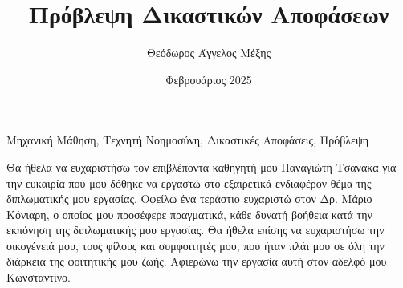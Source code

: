 \documentclass[diploma]{softlab-thesis}
\begin{document}

\frontmatter

\title{Πρόβλεψη Δικαστικών Αποφάσεων}
\author{Θεόδωρος Άγγελος Μέξης}
\date{Φεβρουάριος 2025 }




\maketitle



\begin{abstractgr}%

\begin{keywordsgr}
  Μηχανική Μάθηση,
  Τεχνητή Νοημοσύνη,
  Δικαστικές Αποφάσεις,
  Πρόβλεψη
\end{keywordsgr}
\end{abstractgr}



\begin{abstracten}%

\begin{keywordsen}

\end{keywordsen}
\end{abstracten}



\begin{acknowledgementsgr}
 Θα ήθελα να ευχαριστήσω τον επιβλέποντα καθηγητή μου Παναγιώτη Τσανάκα για την ευκαιρία που μου δόθηκε να εργαστώ στο εξαιρετικά ενδιαφέρον θέμα της διπλωματικής μου εργασίας. Οφείλω ένα τεράστιο ευχαριστώ στον Δρ. Μάριο Κόνιαρη, ο οποίος μου προσέφερε πραγματικά, κάθε δυνατή βοήθεια κατά την εκπόνηση της διπλωματικής μου εργασίας.
 Θα ήθελα επίσης να ευχαριστήσω την οικογένειά μου, τους φίλους και συμφοιτητές μου, που ήταν πλάι μου σε όλη την διάρκεια της φοιτητικής μου ζωής.
 Αφιερώνω την εργασία αυτή στον αδελφό μου Κωνσταντίνο.
\end{acknowledgementsgr}
\end{document}
